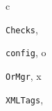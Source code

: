 \documentclass[letterpaper,10pt,english]{sphinxmanual}
\begin{document}
\renewcommand{\indexname}{Python Module Index}
\begin{theindex}
\def\bigletter#1{{\Large\sffamily#1}\nopagebreak\vspace{1mm}}
\bigletter{c}
\item {\texttt{Checks}}, \pageref{api:module-Checks}
\item {\texttt{config}}, \pageref{api:module-config}
\indexspace
\bigletter{o}
\item {\texttt{OrMgr}}, \pageref{api:module-OrMgr}
\indexspace
\bigletter{x}
\item {\texttt{XMLTags}}, \pageref{api:module-XMLTags}
\end{theindex}

\renewcommand{\indexname}{Index}
\printindex
\end{document}
